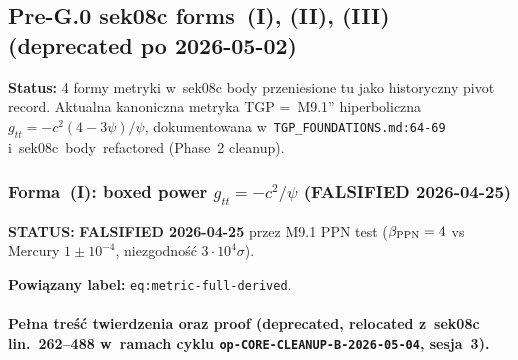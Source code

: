 \subsection{Pre-G.0 sek08c forms~(I), (II), (III)
(deprecated po 2026-05-02)}%
\label{app:pivot-sek08c}

\textbf{Status:} 4 formy metryki w~sek08c body przeniesione tu jako
historyczny pivot record. Aktualna kanoniczna metryka TGP =~M9.1''
hiperboliczna $g_{tt} = -c^2(4-3\psi)/\psi$, dokumentowana
w~\texttt{TGP\_FOUNDATIONS.md:64-69} i~sek08c~body~refactored
(Phase~2 cleanup).

\subsubsection{Forma~(I): boxed power $g_{tt} = -c^2/\psi$
(FALSIFIED 2026-04-25)}\label{app:metric-form-I}

\textbf{STATUS:} \textbf{FALSIFIED 2026-04-25} przez M9.1 PPN test
($\beta_{\rm PPN}=4$ vs Mercury $1\pm 10^{-4}$, niezgodno\'s\'c
$3\cdot 10^4\sigma$).

\textbf{Powiązany label:} \texttt{eq:metric-full-derived}.

\paragraph{Pe\l{}na tre\'s\'c twierdzenia oraz proof (deprecated, relocated
z~sek08c lin.~262--488 w~ramach cyklu \texttt{op-CORE-CLEANUP-B-2026-05-04},
sesja~3).}

